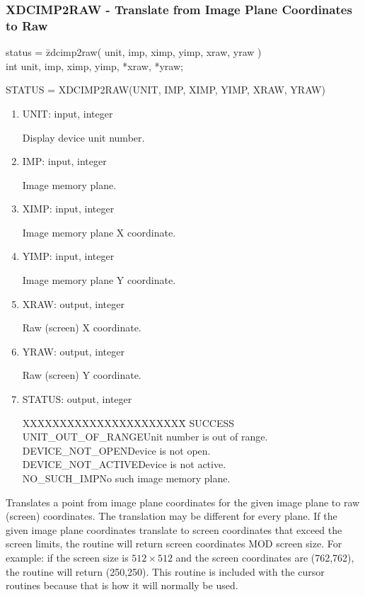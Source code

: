 \subsubsection{XDCIMP2RAW - Translate from Image Plane Coordinates to Raw}
\begin{tabbing}
status = \=zdcimp2raw( unit, imp, ximp, yimp, xraw, yraw )\\
\>int  unit, imp, ximp, yimp, *xraw, *yraw;\\
\end{tabbing}
STATUS = XDCIMP2RAW(UNIT, IMP, XIMP, YIMP, XRAW, YRAW)
\begin{enumerate}
\item UNIT:  input, integer

Display device unit number.
\item IMP:  input, integer

Image memory plane.
\item XIMP:  input, integer

Image memory plane X coordinate.
\item YIMP:  input, integer

Image memory plane Y coordinate.
\item XRAW:  output, integer

Raw (screen) X coordinate.
\item YRAW:  output, integer

Raw (screen) Y coordinate.
\item STATUS:  output, integer
\begin{tabbing}
XXXXXXXXXXXXXXXXXXXXXX\=\kill
SUCCESS\\
UNIT\_OUT\_OF\_RANGE\>Unit number is out of range.\\
DEVICE\_NOT\_OPEN\>Device is not open.\\
DEVICE\_NOT\_ACTIVE\>Device is not active.\\
NO\_SUCH\_IMP\>No such image memory plane.\\
\end{tabbing}
\end{enumerate}
Translates a point from image plane coordinates for the given image
plane to raw (screen) coordinates.  The translation may be different
for every plane.  If the given image plane coordinates translate to
screen coordinates that exceed the screen limits, the routine will
return screen coordinates MOD screen size.  For example:  if the
screen size is $512 \times 512$ and the screen coordinates are (762,762),
the routine will return (250,250).  This routine is included with
the cursor routines because that is how it will normally be used.
\newpage
